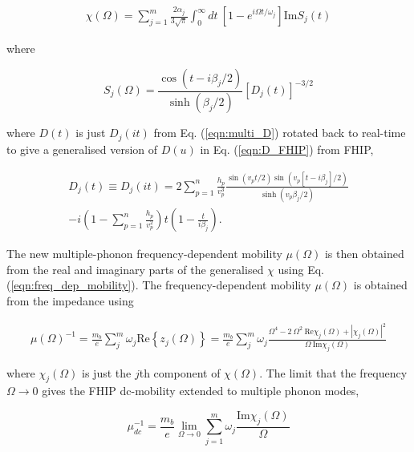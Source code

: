 \begin{equation} \label{eqn:multi_memory}
    \begin{gathered}
        \chi(\Omega) = \sum_{j=1}^m \frac{2\alpha_j}{3\sqrt{\pi}} \int_0^{\infty} dt\ \left[1 - e^{i\Omega t / \omega_j}\right] \textrm{Im} S_j(t)
    \end{gathered}
\end{equation}

where

\begin{equation}
    S_j(\Omega) = \frac{\cos \left(t - i\beta_j/2\right)}{\sinh (\beta_j/2)} [D_j(t)]^{-3/2}
\end{equation}

where $D(t)$ is just $D_j(it)$ from Eq. (\ref{eqn:multi_D}) rotated back to real-time to give a generalised version of $D(u)$ in Eq. (\ref{eqn:D_FHIP}) from FHIP,

\begin{equation}
    \begin{gathered}
        D_j(t) \equiv D_j(it) = 2\sum_{p=1}^n \frac{h_p}{v_{p}^3} \frac{\sin(v_{p} t/2) \sin(v_{p}[t-i\beta_j]/2)}{\sinh(v_{p}\beta_j/2)} \\
        -i \left(1-\sum_{p=1}^n\frac{h_{p}}{v_{p}^2}\right) t \left(1 - \frac{t}{i\beta_j}\right).
    \end{gathered}
\end{equation}

The new multiple-phonon frequency-dependent mobility $\mu(\Omega)$ is then obtained from the real and imaginary parts of the generalised $\chi$ using Eq. (\ref{eqn:freq_dep_mobility}). The frequency-dependent mobility $\mu(\Omega)$ is obtained from the impedance using

\begin{equation}\label{eqn:freq_dep_mobility}
\begin{gathered}
    \mu(\Omega)^{-1} = \frac{m_b}{e} \sum_j^m \omega_j \textrm{Re}\left\{z_j(\Omega)\right\}
    = \frac{m_b}{e} \sum_j^m \omega_j \frac{\Omega^4 - 2\ \Omega^2\  \textrm{Re}\chi_j(\Omega) + |\chi_j(\Omega)|^2}{\Omega\ \textrm{Im}\chi_j(\Omega)}
    \end{gathered}
\end{equation}

where $\chi_j(\Omega)$ is just the $j$th component of $\chi(\Omega)$. The limit that the frequency $\Omega \rightarrow 0$ gives the FHIP dc-mobility extended to multiple phonon modes,

\begin{equation}
    \mu^{-1}_{dc} = \frac{m_b}{e}\lim_{\Omega \rightarrow 0} \sum_{j=1}^m \omega_j \frac{\textrm{Im}\chi_j(\Omega)}{\Omega}
\end{equation}

